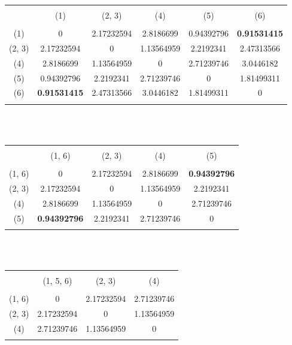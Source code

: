 \documentclass[12pt]{article}
\begin{document}
\begin{tabular}{cccccc}
\hhline{------}\\[-1em]
 & (1) & (2, 3) & (4) & (5) & (6)\\[.2em]
\hhline{------}\\[-1em]
(1) & 0 & 2.17232594 & 2.8186699  & 0.94392796 & \textbf{0.91531415} \\
(2, 3) & 2.17232594 & 0 & 1.13564959 & 2.2192341  & 2.47313566 \\
(4) & 2.8186699 & 1.13564959 & 0 & 2.71239746 & 3.0446182 \\
(5) & 0.94392796 & 2.2192341 & 2.71239746 & 0 & 1.81499311\\
(6) & \textbf{0.91531415} & 2.47313566 & 3.0446182 & 1.81499311 & 0\\
\hhline{------}
\end{tabular}\\\\

\begin{tabular}{ccccc}
\hhline{-----}\\[-1em]
 & (1, 6) & (2, 3) & (4) & (5)\\[.2em]
\hhline{-----}\\[-1em]
(1, 6) & 0 & 2.17232594 & 2.8186699  & \textbf{0.94392796}\\
(2, 3) & 2.17232594 & 0 & 1.13564959 & 2.2192341\\
(4) & 2.8186699 & 1.13564959 & 0 & 2.71239746\\
(5) & \textbf{0.94392796} & 2.2192341 & 2.71239746 & 0\\
\hhline{-----}
\end{tabular}\\\\

\begin{tabular}{cccc}
\hhline{----}\\[-1em]
 & (1, 5, 6) & (2, 3) & (4)\\[.2em]
\hhline{----}\\[-1em]
(1, 6) & 0 & 2.17232594 & 2.71239746  \\
(2, 3) & 2.17232594 & 0 & 1.13564959 \\
(4) & 2.71239746 & 1.13564959 & 0 \\
\hhline{----}
\end{tabular}\\\\\pagebreak
\end{document}
